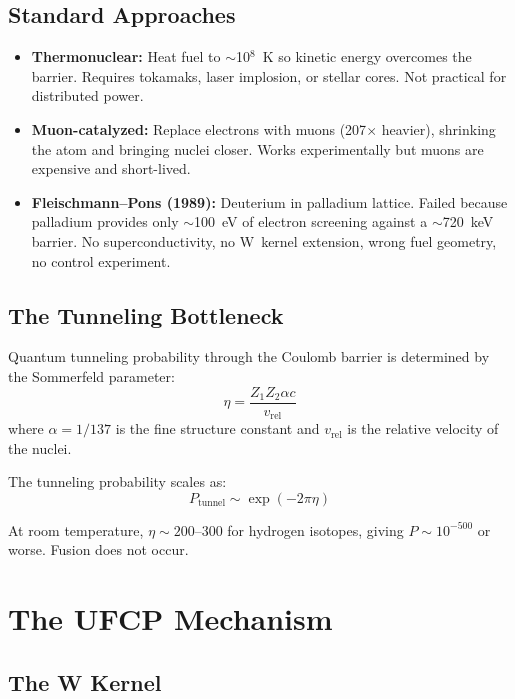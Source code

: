 \documentclass[11pt, a4paper]{article}
\begin{document}
\subsection{Standard Approaches}

\begin{itemize}[nosep]
  \item \textbf{Thermonuclear:} Heat fuel to $\sim$10$^8$~K so
        kinetic energy overcomes the barrier. Requires tokamaks,
        laser implosion, or stellar cores. Not practical for
        distributed power.
  \item \textbf{Muon-catalyzed:} Replace electrons with muons
        (207$\times$ heavier), shrinking the atom and bringing
        nuclei closer. Works experimentally but muons are
        expensive and short-lived.
  \item \textbf{Fleischmann--Pons (1989):} Deuterium in palladium
        lattice. Failed because palladium provides only $\sim$100~eV
        of electron screening against a $\sim$720~keV barrier. No
        superconductivity, no W~kernel extension, wrong fuel
        geometry, no control experiment.
\end{itemize}

\subsection{The Tunneling Bottleneck}

Quantum tunneling probability through the Coulomb barrier is
determined by the Sommerfeld parameter:
\begin{equation}
  \eta = \frac{Z_1 Z_2 \alpha c}{v_{\text{rel}}}
\end{equation}
where $\alpha = 1/137$ is the fine structure constant and
$v_{\text{rel}}$ is the relative velocity of the nuclei.

The tunneling probability scales as:
\begin{equation}
  P_{\text{tunnel}} \sim \exp(-2\pi\eta)
\end{equation}

At room temperature, $\eta \sim 200$--$300$ for hydrogen
isotopes, giving $P \sim 10^{-500}$ or worse. Fusion does not
occur.

\section{The UFCP Mechanism}

\subsection{The W Kernel}
\end{document}
